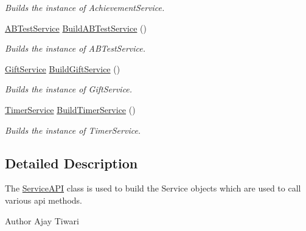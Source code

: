 \begin{DoxyCompactItemize}
\begin{DoxyCompactList}\small\item\em Builds the instance of Achievement\+Service. \end{DoxyCompactList}\item 
\hyperlink{classcom_1_1shephertz_1_1app42_1_1paas_1_1sdk_1_1csharp_1_1ab_test_1_1_a_b_test_service}{A\+B\+Test\+Service} \hyperlink{classcom_1_1shephertz_1_1app42_1_1paas_1_1sdk_1_1csharp_1_1_service_a_p_i_ae30d7ca2639cb1f52ac85c5416f7ee50}{Build\+A\+B\+Test\+Service} ()
\begin{DoxyCompactList}\small\item\em Builds the instance of A\+B\+Test\+Service. \end{DoxyCompactList}\item 
\hyperlink{classcom_1_1shephertz_1_1app42_1_1paas_1_1sdk_1_1csharp_1_1gift_1_1_gift_service}{Gift\+Service} \hyperlink{classcom_1_1shephertz_1_1app42_1_1paas_1_1sdk_1_1csharp_1_1_service_a_p_i_af71aa7d43fdcfa52f2673e9465383361}{Build\+Gift\+Service} ()
\begin{DoxyCompactList}\small\item\em Builds the instance of Gift\+Service. \end{DoxyCompactList}\item 
\hyperlink{classcom_1_1shephertz_1_1app42_1_1paas_1_1sdk_1_1csharp_1_1timer_1_1_timer_service}{Timer\+Service} \hyperlink{classcom_1_1shephertz_1_1app42_1_1paas_1_1sdk_1_1csharp_1_1_service_a_p_i_a379a09729d4801e7fe5b8ddb4564816a}{Build\+Timer\+Service} ()
\begin{DoxyCompactList}\small\item\em Builds the instance of Timer\+Service. \end{DoxyCompactList}\end{DoxyCompactItemize}


\subsection{Detailed Description}
The \hyperlink{classcom_1_1shephertz_1_1app42_1_1paas_1_1sdk_1_1csharp_1_1_service_a_p_i}{Service\+A\+P\+I} class is used to build the Service objects which are used to call various api methods. 

\begin{DoxyAuthor}{Author}
Ajay Tiwari 
\end{DoxyAuthor}


